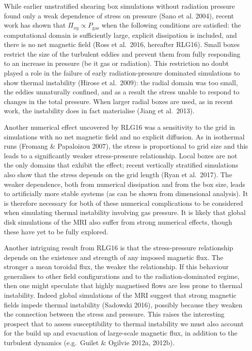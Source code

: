 \documentclass[useAMS]{mn2e}
\begin{document}
While earlier unstratified shearing box simulations without radiation
pressure found only a weak dependence of stress on pressure (Sano et
al. 2004), recent work has shown that $\Pi_{xy}\propto P_{\text{gas}}$
when the following conditions are satisfied: the computational
domain is sufficiently large, explicit dissipation is included, and
there is no net magnetic field (Ross et al.~2016, hereafter RLG16). 
Small boxes restrict the size of the turbulent eddies and
prevent them from fully responding to an increase in
pressure (be it gas or radiation). This restriction no doubt played a role
in the failure of early radiation-pressure dominated simulations to
show thermal instability (Hirose et al.~2009): the radial
domain was too small, the eddies unnaturally
confined, and as a result the stress unable to respond to changes in
the total pressure.
When larger radial boxes are used, as in recent work, the instability
does in fact materialise (Jiang et al.~2013).

Another numerical effect uncovered by RLG16 was a sensitivity to the
grid in simulations with no net magnetic field and
no explicit diffusion. As in isothermal runs
(Fromang \& Papaloizou 2007), the stress is proportional to grid
size and this leads to a significantly weaker stress-pressure
relationship. 
Local boxes are not the only domains that exhibit the effect;
recent vertically stratified simulations also show that
the stress depends on the grid length (Ryan et al.~2017). 
The weaker dependence, both from numerical dissipation and from the
box size, leads to artificially more stable systems (as can be shown
from dimensional analysis). It
is therefore necessary for both of these numerical complications 
to be considered when simulating thermal instability involving gas pressure. 
It is likely that global disk simulations of the
MRI also suffer from strong numerical effects, though these have
yet to be fully explored.

Another intriguing result from RLG16 is that the stress-pressure 
relationship depends on the existence and strength of any imposed magnetic flux.
The stronger a mean toroidal flux, the weaker the relationship. If this
behaviour generalises to other field configurations and to
the radiation-dominated regime, then one
might speculate that highly magnetised flows are less prone to thermal
instability. Indeed global simulations of the MRI
suggest that strong magnetic fields impede thermal instability (Sadowski 2016), 
possibly because they weaken the connection between the stress and
pressure. This raises the interesting prospect that to assess
susceptibility to thermal instability we must also account for the
build up and evacuation of large-scale magnetic flux, in addition to
the turbulent dynamics (e.g.\ Guilet \& Ogilvie 2012a, 2012b). 
\end{document}

